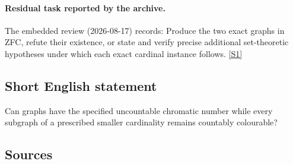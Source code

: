 \documentclass[11pt,a4paper]{article}
\newcommand{\sref}[2]{\hyperlink{source:#1:#2}{[S#2]}}
\begin{document}
\paragraph{Residual task reported by the archive.}

The embedded review (2026-08-17) records: Produce the two exact graphs in ZFC, refute their existence, or state and verify precise additional set-theoretic hypotheses under which each exact cardinal instance follows. \sref{statement}{1}

\subsection{Short English statement}

Can graphs have the specified uncountable chromatic number while every subgraph of a prescribed smaller cardinality remains countably colourable?

\subsection{Sources}
\end{document}

